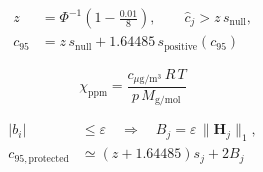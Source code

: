 \documentclass{article}
\begin{document}
\newpage
\[\displaystyle \begin{aligned}z&=\Phi^{-1}\!\left(1-\frac{0.01}{8}\right),\qquad\widehat c_j>z\,s_{\mathrm{null}},\\[4pt]c_{95}&=z\,s_{\mathrm{null}}+1.64485\,s_{\mathrm{positive}}(c_{95})\end{aligned}\]

\newpage
\[\displaystyle \chi_{\mathrm{ppm}}=\frac{c_{\mu\mathrm{g}/\mathrm m^3}\,R\,T}{p\,M_{\mathrm g/\mathrm{mol}}}\]

\newpage
\[\displaystyle \begin{aligned}|b_i|&\leq\varepsilon\quad\Longrightarrow\quad B_j=\varepsilon\,\lVert\mathbf H_j\rVert_1,\\[4pt]c_{95,\mathrm{protected}}&\simeq(z+1.64485)s_j+2B_j\end{aligned}\]
\end{document}

